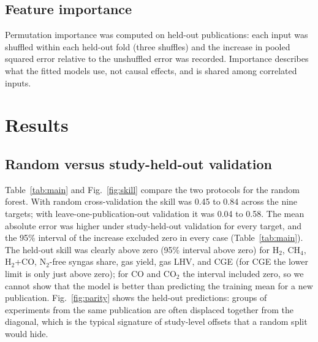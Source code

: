 \documentclass[11pt,a4paper]{article}
\begin{document}
\subsection{Feature importance}
Permutation importance was computed on held-out publications: each input was shuffled within each held-out fold (three shuffles) and the increase in pooled squared error relative to the unshuffled error was recorded. Importance describes what the fitted models use, not causal effects, and is shared among correlated inputs.

\section{Results}
\subsection{Random versus study-held-out validation}
Table~\ref{tab:main} and Fig.~\ref{fig:skill} compare the two protocols for the random forest. With random cross-validation the skill was 0.45 to 0.84 across the nine targets; with leave-one-publication-out validation it was 0.04 to 0.58. The mean absolute error was higher under study-held-out validation for every target, and the 95\% interval of the increase excluded zero in every case (Table~\ref{tab:main}). The held-out skill was clearly above zero (95\% interval above zero) for H$_2$, CH$_4$, H$_2$+CO, N$_2$-free syngas share, gas yield, gas LHV, and CGE (for CGE the lower limit is only just above zero); for CO and CO$_2$ the interval included zero, so we cannot show that the model is better than predicting the training mean for a new publication. Fig.~\ref{fig:parity} shows the held-out predictions: groups of experiments from the same publication are often displaced together from the diagonal, which is the typical signature of study-level offsets that a random split would hide.
\end{document}
